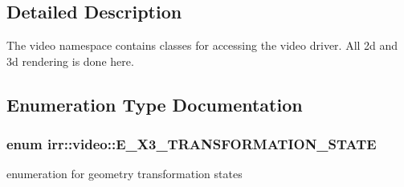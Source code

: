 \subsection{Detailed Description}
The video namespace contains classes for accessing the video driver. All 2d and 3d rendering is done here. 

\subsection{Enumeration Type Documentation}
\subsubsection[{\texorpdfstring{E\+\_\+4\+X3\+\_\+\+T\+R\+A\+N\+S\+F\+O\+R\+M\+A\+T\+I\+O\+N\+\_\+\+S\+T\+A\+TE}{E\_4X3\_TRANSFORMATION\_STATE}}]{\setlength{\rightskip}{0pt plus 5cm}enum {\bf irr\+::video\+::\+E\+\_\+X3\+\_\+\+T\+R\+A\+N\+S\+F\+O\+R\+M\+A\+T\+I\+O\+N\+\_\+\+S\+T\+A\+TE}}\hypertarget{namespaceirr_1_1video_a9f34b0dd7b888c8cbabb22989f23b853}{}\label{namespaceirr_1_1video_a9f34b0dd7b888c8cbabb22989f23b853}


enumeration for geometry transformation states 


